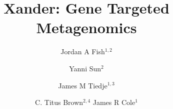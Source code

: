 \documentclass[10pt]{bmc_article}
\newenvironment{bmcformat}{\begin{raggedright}\baselineskip20pt\sloppy\setboolean{publ}{false}}{\end{raggedright}\baselineskip20pt\sloppy}
\begin{document}
\begin{bmcformat}



\title{Xander: Gene Targeted Metagenomics}
 


\author{Jordan A Fish\correspondingauthor$^{1,2}$%
      \and
         Yanni Sun$^2$%
       \and
         James M Tiedje$^{1,3}$%
       \and
         C. Titus Brown$^{2,4}$%
         James R Cole$^1$%
      }
      


\address{%
    \iid(1)Center for Microbial Ecology, Michigan State University
    \iid(2)Department of Computer Science and Engineer, Michigan State University
    \iid(3)Department of Plant, Soil and Microbial Sciences, Michigan State University
    \iid(4)Microbiology and Molecular Genetics, Michigan State University
}%

\maketitle




\end{bmcformat}
\end{document}
